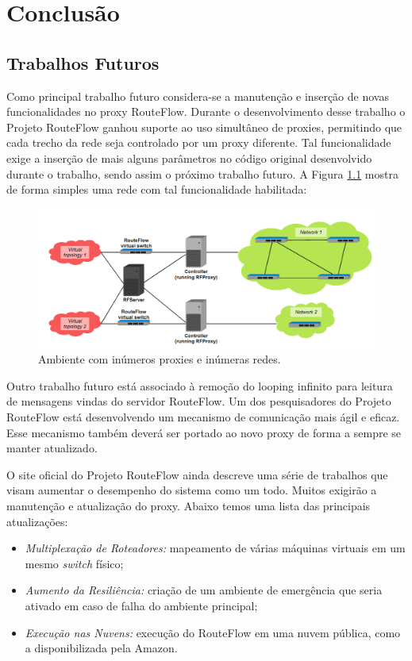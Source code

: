 \chapter{Conclusão}

\section{Trabalhos Futuros}

Como principal trabalho futuro considera-se a manutenção e 
inserção de novas funcionalidades no proxy RouteFlow.
Durante o desenvolvimento desse trabalho o Projeto
 RouteFlow ganhou suporte ao uso simultâneo de proxies, 
permitindo que cada trecho da rede seja controlado por um
proxy diferente. Tal funcionalidade exige a inserção de 
mais alguns parâmetros no código original desenvolvido
 durante o trabalho, sendo assim o próximo trabalho futuro.
A Figura \ref{fig:multiplosProxies} mostra de forma simples 
uma rede com tal funcionalidade habilitada:

\begin{figure}[h] 
\centering
\includegraphics[width=160mm]{multiplosProxies.png}
\caption{Ambiente com inúmeros proxies e inúmeras redes.}
\label{fig:multiplosProxies} 
\end{figure}

Outro trabalho futuro está associado à remoção do looping infinito 
para leitura de mensagens vindas do servidor RouteFlow. 
Um dos pesquisadores do Projeto RouteFlow está
desenvolvendo um mecanismo de comunicação mais ágil e
 eficaz. Esse mecanismo também deverá ser portado ao 
 novo proxy de forma a sempre se manter atualizado.

O site oficial do Projeto RouteFlow ainda descreve uma 
série de trabalhos que visam aumentar o desempenho do
sistema como um todo. Muitos exigirão a manutenção e 
atualização do proxy. Abaixo temos uma lista das principais
atualizações:

\begin{itemize}
\item \textit{Multiplexação de Roteadores:} mapeamento
de várias máquinas virtuais em um mesmo \textit{switch}
físico;
\item \textit{Aumento da Resiliência:} criação de um ambiente
de emergência que seria ativado em caso de falha do ambiente
principal;
\item \textit{Execução nas Nuvens:} execução do RouteFlow
em uma nuvem pública, como a disponibilizada pela Amazon.
\end{itemize}

